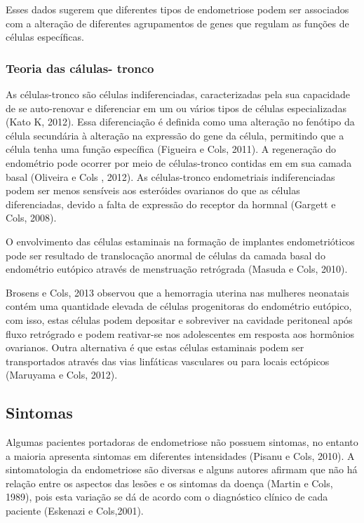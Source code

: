 \documentclass[12pt]{article} %
\begin{document}
Esses dados sugerem que diferentes tipos de endometriose podem ser associados com a alteração de diferentes agrupamentos de genes que regulam as funções de células específicas.

\subsubsection{Teoria das cálulas- tronco}

As células-tronco são células indiferenciadas, caracterizadas pela sua
capacidade de se auto-renovar e diferenciar em um ou vários tipos de
células especializadas (Kato K, 2012). Essa diferenciação é definida
como uma alteração no fenótipo da célula secundária à alteração na
expressão do gene da célula, permitindo que a célula tenha uma função
específica (Figueira e Cols, 2011). A regeneração do endométrio pode
ocorrer por meio de células-tronco contidas em em sua camada basal
(Oliveira e Cols , 2012). As células-tronco endometriais indiferenciadas podem ser menos sensíveis aos esteróides ovarianos do que as células diferenciadas, devido a falta de expressão do receptor da hormnal (Gargett e Cols, 2008).

O envolvimento das células estaminais na formação de implantes endometrióticos pode ser resultado de translocação anormal de células da camada basal do endométrio eutópico através de menstruação retrógrada (Masuda e Cols, 2010).

Brosens e Cols, 2013 observou que a hemorragia uterina nas mulheres neonatais contém uma quantidade elevada de células progenitoras do endométrio eutópico, com isso, estas células podem depositar e sobreviver na cavidade peritoneal após fluxo retrógrado e podem reativar-se nos adolescentes em resposta aos hormônios ovarianos. Outra alternativa é que estas células estaminais podem ser transportados através das vias linfáticas vasculares ou para locais ectópicos (Maruyama e Cols, 2012).

\subsection{Sintomas} 

Algumas pacientes portadoras de endometriose não possuem sintomas, no entanto a maioria apresenta sintomas
em diferentes intensidades (Pisanu e Cols, 2010). A sintomatologia da endometriose são diversas e alguns autores afirmam que não há relação entre os aspectos das lesões e os sintomas da doença (Martin e Cols, 1989), pois esta variação se dá de acordo com o diagnóstico clínico de cada paciente (Eskenazi e Cols,2001).
\end{document}
